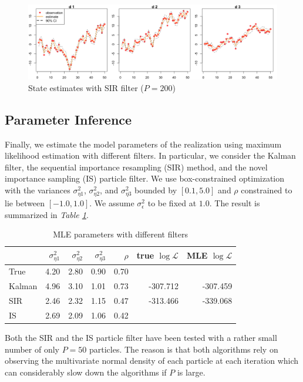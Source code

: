 \documentclass[11pt, oneside]{scrreprt}   	%
\begin{document}
\begin{figure}[h!]
\centering
\includegraphics[width=155mm]{../../images/mllm-estimate-sir.png}
\caption{State estimates with SIR filter ($P=200$)}
\label{fig:mllm_estimate_sir}
\end{figure}

\subsection{Parameter Inference}
Finally, we estimate the model parameters of the realization using maximum likelihood estimation with different filters. In particular, we consider the Kalman filter, the sequential importance resampling (SIR) method, and the novel importance sampling (IS) particle filter. We use box-constrained optimization with the variances $\sigma_{\eta 1}^2$,  $\sigma_{\eta 2}^2$, and $\sigma_{\eta 3}^2$ bounded by $[0.1,5.0]$ and  $\rho$ constrained to lie between $[-1.0, 1.0]$. We assume $\sigma_{\epsilon}^2$ to be fixed at $1.0$. The result is summarized in \textit{Table \ref{tab:mllm_param_inference}}.\\  

\begin{table}[h!]
\centering
\begin{tabular}{l r r r r r r}
\hline
& $\sigma_{\eta 1}^2$ &  $\sigma_{\eta 2}^2$ & $\sigma_{\eta 3}^2$ & $\rho$ & true $\log \mathcal{L} $ & MLE $\log \mathcal{L} $ \\
\hline
True        & 4.20  & 2.80 &  0.90 & 0.70&  &  \\
Kalman   & 4.96  & 3.10  & 1.01 & 0.73 & -307.712 & -307.459 \\
SIR         & 2.46  & 2.32  & 1.15 & 0.47 & -313.466 & -339.068 \\
IS            & 2.69  & 2.09  & 1.06 & 0.42 &  & \\
\hline
\end{tabular}
\caption{MLE parameters with different filters}
\label{tab:mllm_param_inference}
\end{table}
Both the SIR and the IS particle filter have been tested with a rather small number of only $P=50$ particles. The reason is that both algorithms rely on observing the multivariate normal density of each particle at each iteration which can considerably slow down the algorithms if $P$ is large. \\                              
    
\end{document}
